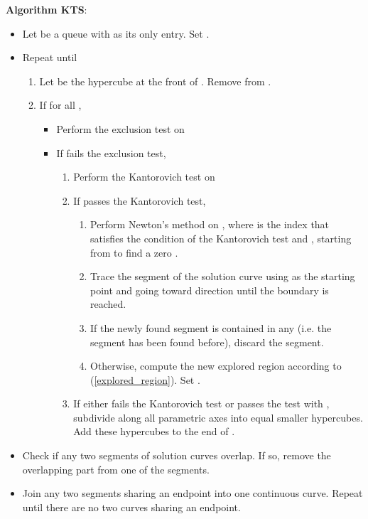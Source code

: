 \documentclass{article}
\begin{document}
\begin{flushleft}
\textbf{Algorithm KTS}:
\end{flushleft}
\begin{itemize}
\item Let  be a queue with  as its only entry. Set . \item Repeat until 
\begin{enumerate}
\item Let  be the hypercube at the front of .  Remove 
from . \item If  for all ,
\begin{itemize}
\item Perform the exclusion test on 
\item If  fails the exclusion test,
\begin{enumerate}
\item Perform the Kantorovich test on 
\item If  passes the Kantorovich test,
\begin{enumerate}
\item Perform Newton's method on , where  is the
index that satisfies the condition of the Kantorovich test and , starting from  to find a zero .

\item Trace the segment of the solution curve using  as
the starting point and going toward  direction until the
 boundary is reached.

\item If the newly found segment is contained in any  (i.e. the segment has been found before), discard the segment.

\item Otherwise, compute the new explored region  according
to (\ref{explored_region}).  Set .
\end{enumerate}
\item If either  fails the Kantorovich test or  passes the
test with , subdivide  along all 
parametric axes into  equal smaller hypercubes. Add these hypercubes to
the end of .
\end{enumerate}
\end{itemize}
\end{enumerate}
\item Check if any two segments of solution curves overlap. If
so, remove the overlapping part from one of the segments.

\item Join any two segments sharing an endpoint into one
continuous curve. Repeat until there are no two curves sharing an
endpoint.
\end{itemize}
\end{document}
